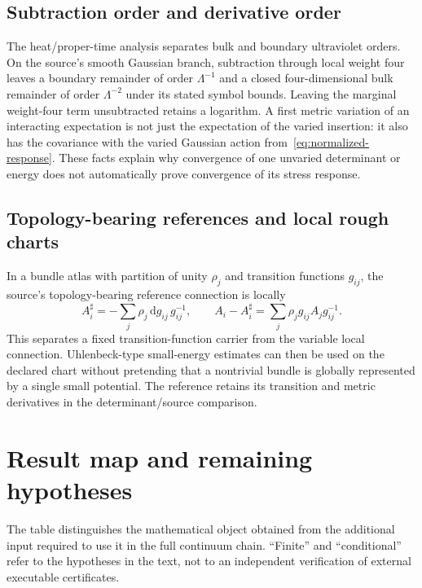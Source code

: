 \documentclass[11pt,a4paper,oneside]{book}
\theoremstyle{plain}
\theoremstyle{definition}
\theoremstyle{remark}
\newcommand{\dd}{\mathrm d}
\begin{document}
\section{Subtraction order and derivative order}
The heat/proper-time analysis separates bulk and boundary ultraviolet orders. On the source's smooth Gaussian branch, subtraction through local weight four leaves a boundary remainder of order $\Lambda^{-1}$ and a closed four-dimensional bulk remainder of order $\Lambda^{-2}$ under its stated symbol bounds. Leaving the marginal weight-four term unsubtracted retains a logarithm. A first metric variation of an interacting expectation is not just the expectation of the varied insertion: it also has the covariance with the varied Gaussian action from~\eqref{eq:normalized-response}. These facts explain why convergence of one unvaried determinant or energy does not automatically prove convergence of its stress response. \cite{R1,R2}

\section{Topology-bearing references and local rough charts}
In a bundle atlas with partition of unity $\rho_j$ and transition functions $g_{ij}$, the source's topology-bearing reference connection is locally
\begin{equation}
 A_i^\sharp=-\sum_j\rho_j\,\dd g_{ij}\,g_{ij}^{-1},
 \qquad
 A_i-A_i^\sharp=\sum_j\rho_j g_{ij}A_jg_{ij}^{-1}.
 \label{eq:topology-reference}
\end{equation}
This separates a fixed transition-function carrier from the variable local connection. Uhlenbeck-type small-energy estimates can then be used on the declared chart without pretending that a nontrivial bundle is globally represented by a single small potential. The reference retains its transition and metric derivatives in the determinant/source comparison. \cite{R4}

\chapter{Result map and remaining hypotheses}
\label{app:map}
The table distinguishes the mathematical object obtained from the additional input required to use it in the full continuum chain. ``Finite'' and ``conditional'' refer to the hypotheses in the text, not to an independent verification of external executable certificates.
\end{document}
